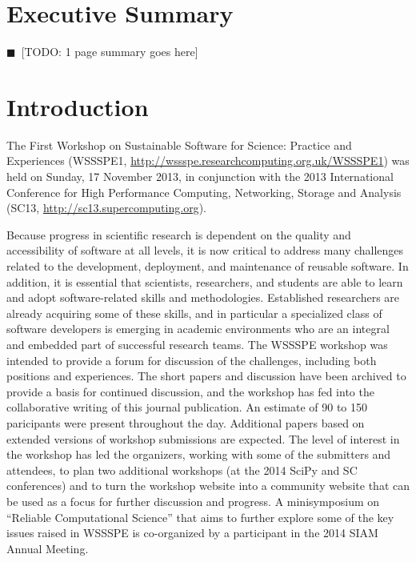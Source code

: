 \documentclass[11pt, oneside]{amsart}
\newcommand{\todo}[1]{{\color{blue}$\blacksquare$~\textsf{[TODO: #1]}}}
\newcommand{\note}[1]{ {\textcolor{red}    { #1 }}}
\begin{document}
\pagebreak

\section*{Executive Summary}

\todo{1 page summary goes here}

\pagebreak

\section{Introduction}

The First Workshop on Sustainable Software for Science: Practice and
Experiences (WSSSPE1,
\url{http://wssspe.researchcomputing.org.uk/WSSSPE1}) was held on
Sunday, 17 November 2013, in conjunction with the 2013 International
Conference for High Performance Computing, Networking, Storage and
Analysis (SC13, \url{http://sc13.supercomputing.org}).

Because progress in scientific research is dependent on the quality and
accessibility of software at all levels, it is now critical to address many
challenges related to the development, deployment, and maintenance of reusable
software.
In addition, it is essential that scientists,
researchers, and students are able to learn and adopt software-related skills
and methodologies. Established researchers are already acquiring some of these
skills, and in particular a specialized class of software developers is
emerging in academic environments who are an integral and embedded part of
successful research teams. The WSSSPE workshop was intended to provide a forum
for discussion of the challenges, including both positions and experiences. The
short papers and discussion have been archived to provide a basis for continued
discussion, and the workshop has fed into the collaborative writing of this
journal publication. An estimate of 90 to 150 paricipants were present 
throughout the day. Additional papers based on extended versions of workshop
submissions are expected.  The level of interest in the workshop has led the
organizers, working with some of the submitters and attendees, to plan two
additional workshops (at the 2014 SciPy and SC conferences) and to turn the
workshop website into a community website that can be used as a focus for
further discussion and progress.  A minisymposium on ``Reliable Computational
Science'' that aims to further explore some of the key issues raised in WSSSPE
is co-organized by a participant in the 2014 SIAM Annual Meeting.
\end{document}

